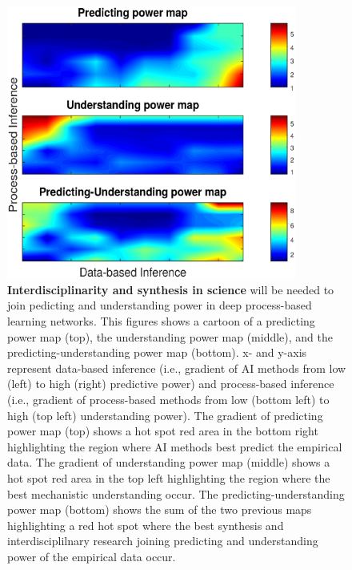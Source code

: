\documentclass[authoryear,1p,12pt]{elsarticle}
\begin{document}
\begin{figure}
  \begin{center}
        \hspace{-0.5 in}\includegraphics[width=0.85\textwidth]{Figure3.eps}
     \end{center}
     \vspace{-0.15 in}
     \caption{{\bf Interdisciplinarity and synthesis in science} will
       be needed to join pedicting and understanding power in deep
       process-based learning networks. This figures shows a cartoon
       of a predicting power map (top), the understanding power map
       (middle), and the predicting-understanding power map
       (bottom). x- and y-axis represent data-based inference (i.e.,
       gradient of AI methods from low (left) to high (right)
       predictive power) and process-based inference (i.e., gradient
       of process-based methods from low (bottom left) to high (top
       left) understanding power). The gradient of predicting power
       map (top) shows a hot spot red area in the bottom right
       highlighting the region where AI methods best predict the
       empirical data. The gradient of understanding power map
       (middle) shows a hot spot red area in the top left highlighting
       the region where the best mechanistic understanding occur. The
       predicting-understanding power map (bottom) shows the sum of
       the two previous maps highlighting a red hot spot where the
       best synthesis and interdisciplilnary research joining
       predicting and understanding power of the empirical data
       occur.}
\end{figure}
\end{document}
